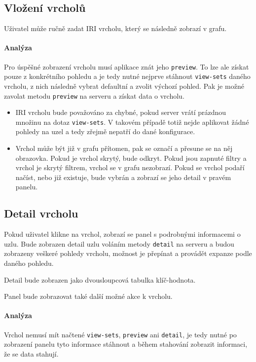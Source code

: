 \subsection*{Vložení vrcholů}
Uživatel může ručně zadat IRI vrcholu, který se následně zobrazí v grafu.

\paragraph{Analýza} Pro úspěšné zobrazení vrcholu musí aplikace znát jeho \texttt{preview}. To lze ale získat pouze z konkrétního pohledu a je tedy nutné nejprve stáhnout \texttt{view-sets} daného vrcholu, z nich následně vybrat defaultní a zvolit výchozí pohled. Pak je možné zavolat metodu \texttt{preview} na serveru a získat data o vrcholu.

\begin{itemize}
    \item IRI vrcholu bude považováno za chybné, pokud server vrátí prázdnou množinu na dotaz \texttt{view-sets}. V takovém případě totiž nejde aplikovat žádné pohledy na uzel a tedy zřejmě nepatří do dané konfigurace.
    \item Vrchol může být již v grafu přítomen, pak se označí a přesune se na něj obrazovka. Pokud je vrchol skrytý, bude odkryt. Pokud jsou zapnuté filtry a vrchol je skrytý filtrem, vrchol se v grafu nezobrazí. Pokud se vrchol podaří načíst, nebo již existuje, bude vybrán a zobrazí se jeho detail v pravém panelu.
\end{itemize}

\subsection*{Detail vrcholu}
Pokud uživatel klikne na vrchol, zobrazí se panel s podrobnými informacemi o uzlu. Bude zobrazen detail uzlu voláním metody \texttt{detail} na serveru a budou zobrazeny veškeré pohledy vrcholu, možnost je přepínat a provádět expanze podle daného pohledu.

Detail bude zobrazen jako dvousloupcová tabulka klíč-hodnota.

Panel bude zobrazovat také další možné akce k vrcholu.

\paragraph{Analýza} Vrchol nemusí mít načtené \texttt{view-sets}, \texttt{preview} ani \texttt{detail}, je tedy nutné po zobrazení panelu tyto informace stáhnout a během stahování zobrazit informaci, že se data stahují.


